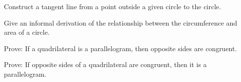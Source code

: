 \begin{prob}
Construct a tangent line from a point outside a given circle to the circle.
\end{prob}

\begin{prob}
Give an informal derivation of the relationship between the circumference and area of a circle. 
\end{prob}

\begin{prob}
Prove:  If a quadrilateral is a parallelogram, then opposite sides are congruent.
\end{prob}

\begin{prob}
Prove:  If opposite sides of a quadrilateral are congruent, then it is a parallelogram.
\end{prob}


